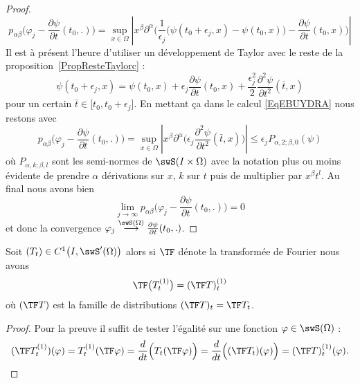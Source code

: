 \begin{proof}
\begin{equation}
            p_{\alpha\beta}\big( \varphi_j-\frac{ \partial \psi }{ \partial t }(t_0,.) \big)=\sup_{x\in\Omega}\left| x^{\beta}\partial^{\alpha}\Big( \frac{1}{ \epsilon_j }\big(\psi(t_0+\epsilon_j,x)-\psi(t_0,x)\big) -\frac{ \partial \psi }{ \partial t }(t_0,x) \Big)\right|
    \end{equation}
    Il est à présent l'heure d'utiliser un développement de Taylor avec le reste de la proposition~\ref{PropResteTaylorc} :
    \begin{equation}
        \psi(t_0+\epsilon_j,x)=\psi(t_0,x)+\epsilon_j\frac{ \partial \psi }{ \partial t }(t_0,x)+\frac{ \epsilon_j^2 }{2}\frac{ \partial^2\psi  }{ \partial t^2 }(\bar t,x)
    \end{equation}
    pour un certain \( \bar t\in\mathopen[ t_0 , t_0+\epsilon_j \mathclose]\). En mettant ça dans le calcul \eqref{EqEBUYDRA} nous restons avec
    \begin{equation}
        p_{\alpha\beta}\big( \varphi_j-\frac{ \partial \psi }{ \partial t }(t_0,.) \big)=\sup_{x\in\Omega}\left| x^{\beta}\partial^{\alpha}\Big( \epsilon_j\frac{ \partial^2\psi }{ \partial t^2 }(\bar t,x) \Big) \right| \leq \epsilon_j P_{\alpha,2;\beta,0}(\psi)
    \end{equation}
    où \( P_{\alpha,k;\beta,l}\) sont les semi-normes de \( \swS(I\times \Omega)\) avec la notation plus ou moins évidente de prendre \( \alpha\) dérivations sur \( x\), \( k\) sur \( t\) puis de multiplier par \( x^{\beta}t^l\). Au final nous avons bien
    \begin{equation}
        \lim_{j\to \infty} p_{\alpha\beta}\big( \varphi_j-\frac{ \partial \psi }{ \partial t }(t_0,.) \big)=0
    \end{equation}
    et donc la convergence \( \varphi_j\stackrel{\swS(\Omega)}{\longrightarrow}\frac{ \partial \psi }{ \partial t }(t_0,.)\).
\end{proof}

\begin{lemma}   \label{LemWRoRPIX}
    Soit \( (T_t)\in C^1\big( I,\swS'(\Omega) \big)\) alors si \( \TF\) dénote la transformée de Fourier nous avons
    \begin{equation}
        \TF\big( T_t^{(1)} \big)=(\TF T)_t^{(1)}
    \end{equation}
    où \( (\TF T)\) est la famille de distributions \( (\TF T)_t=\TF T_t\).
\end{lemma}

\begin{proof}
    Pour la preuve il suffit de tester l'égalité sur une fonction \( \varphi\in\swS(\Omega)\) :
    \begin{equation}
        (\TF T_t^{(1)})(\varphi)=T_t^{(1)}(\TF \varphi)=\frac{ d }{ dt }\Big( T_t(\TF \varphi) \Big)=\frac{ d }{ dt }\Big( (\TF T_t)(\varphi) \Big)=(\TF T)_t^{(1)}(\varphi).
    \end{equation}
\end{proof}

